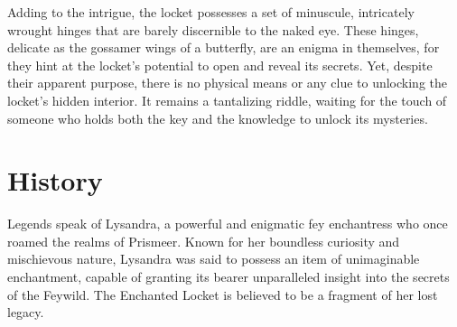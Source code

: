 \documentclass[letterpaper,openany,oneside,twocolumn]{book}
\begin{document}
Adding to the intrigue, the locket possesses a set of minuscule, intricately wrought hinges that are barely discernible to the naked eye. These hinges, delicate as the gossamer wings of a butterfly, are an enigma in themselves, for they hint at the locket's potential to open and reveal its secrets. Yet, despite their apparent purpose, there is no physical means or any clue to unlocking the locket's hidden interior. It remains a tantalizing riddle, waiting for the touch of someone who holds both the key and the knowledge to unlock its mysteries.
\eject
\section*{History}
Legends speak of Lysandra, a powerful and enigmatic fey enchantress who once roamed the realms of Prismeer. Known for her boundless curiosity and mischievous nature, Lysandra was said to possess an item of unimaginable enchantment, capable of granting its bearer unparalleled insight into the secrets of the Feywild. The Enchanted Locket is believed to be a fragment of her lost legacy.
\vspace*{-1.2\fontdimen6\font}
\end{document}
